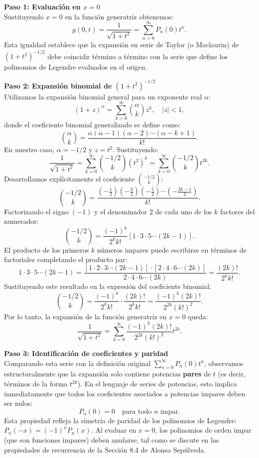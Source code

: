 \documentclass[a4paper]{article}
\begin{document}
\vspace{0.3cm}
\noindent\textbf{Paso 1: Evaluación en $x=0$}\\
Sustituyendo $x=0$ en la función generatriz obtenemos:
$$
g(0,t) = \frac{1}{\sqrt{1 + t^2}} = \sum_{n=0}^{\infty} P_n(0) t^n.
$$
Esta igualdad establece que la expansión en serie de Taylor (o Maclaurin) de $(1+t^2)^{-1/2}$ debe coincidir término a término con la serie que define los polinomios de Legendre evaluados en el origen.

\vspace{0.3cm}
\noindent\textbf{Paso 2: Expansión binomial de $(1+t^2)^{-1/2}$}\\
Utilizamos la expansión binomial general para un exponente real $\alpha$:
$$
(1+z)^\alpha = \sum_{k=0}^{\infty} \binom{\alpha}{k} z^k, \quad |z| < 1,
$$
donde el coeficiente binomial generalizado se define como:
$$
\binom{\alpha}{k} = \frac{\alpha(\alpha-1)(\alpha-2)\cdots(\alpha-k+1)}{k!}.
$$
En nuestro caso, $\alpha = -1/2$ y $z = t^2$. Sustituyendo:
$$
\frac{1}{\sqrt{1+t^2}} = \sum_{k=0}^{\infty} \binom{-1/2}{k} (t^2)^k = \sum_{k=0}^{\infty} \binom{-1/2}{k} t^{2k}.
$$
Desarrollamos explícitamente el coeficiente $\binom{-1/2}{k}$:
$$
\binom{-1/2}{k} = \frac{(-\frac{1}{2})(-\frac{3}{2})(-\frac{5}{2})\cdots(-\frac{2k-1}{2})}{k!}.
$$
Factorizando el signo $(-1)$ y el denominador $2$ de cada uno de los $k$ factores del numerador:
$$
\binom{-1/2}{k} = \frac{(-1)^k}{2^k k!} \left[1 \cdot 3 \cdot 5 \cdots (2k-1)\right].
$$
El producto de los primeros $k$ números impares puede escribirse en términos de factoriales completando el producto par:
$$
1 \cdot 3 \cdot 5 \cdots (2k-1) = \frac{[1 \cdot 2 \cdot 3 \cdots (2k-1)] \cdot [2 \cdot 4 \cdot 6 \cdots (2k)]}{2 \cdot 4 \cdot 6 \cdots (2k)} = \frac{(2k)!}{2^k k!}.
$$
Sustituyendo este resultado en la expresión del coeficiente binomial:
$$
\binom{-1/2}{k} = \frac{(-1)^k}{2^k k!} \cdot \frac{(2k)!}{2^k k!} = \frac{(-1)^k (2k)!}{2^{2k} (k!)^2}.
$$
Por lo tanto, la expansión de la función generatriz en $x=0$ queda:
$$
\frac{1}{\sqrt{1+t^2}} = \sum_{k=0}^{\infty} \frac{(-1)^k (2k)!}{2^{2k} (k!)^2} t^{2k}.
$$

\vspace{0.3cm}
\noindent\textbf{Paso 3: Identificación de coeficientes y paridad}\\
Comparando esta serie con la definición original $\sum_{n=0}^{\infty} P_n(0) t^n$, observamos estructuralmente que la expansión solo contiene potencias \textbf{pares} de $t$ (es decir, términos de la forma $t^{2k}$). En el lenguaje de series de potencias, esto implica inmediatamente que todos los coeficientes asociados a potencias impares deben ser nulos:
$$
P_n(0) = 0 \quad \text{para todo } n \text{ impar}.
$$
Esta propiedad refleja la simetría de paridad de los polinomios de Legendre: $P_n(-x) = (-1)^n P_n(x)$. Al evaluar en $x=0$, los polinomios de orden impar (que son funciones impares) deben anularse, tal como se discute en las propiedades de recurrencia de la Sección 8.4 de Alonso Sepúlveda.
\end{document}
